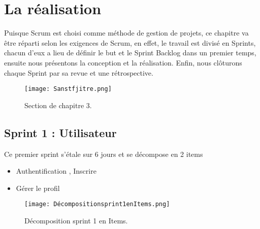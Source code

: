 \chapter{La réalisation }
\label{sec:conception}

\begin{fquote}Puisque Scrum est choisi comme méthode de gestion de projets, ce chapitre va être réparti selon
	les exigences de Scrum, en effet, le travail est divisé en Sprints, chacun d’eux a lieu de définir le but
	et le Sprint Backlog dans un premier temps, ensuite nous présentons la conception et la réalisation.
	Enfin, nous clôturons chaque Sprint par sa revue et une rétrospective.
 \end{fquote}
\begin{figure}[ht]
	\centering
	\texttt{[image: Sanstfjitre.png]}
	\caption{Section de chapitre 3.}
	\label{fig:Section de chapitre 3}
\end{figure}
\FloatBarrier
\clearpage

\section{Sprint 1 : Utilisateur }
\label{sec:conception}

\begin{fquote}
Ce premier sprint s’étale sur 6 jours et se décompose en 2 items  \end{fquote}
\smallskip
\begin{itemize}[label=$\diamond$]
	\item Authentification , Inscrire
	\item Gérer le profil
\end{itemize}
\medskip
\medskip
\medskip
\medskip
\medskip
\medskip
\medskip
\medskip
\medskip
\medskip
\begin{figure}[ht]
	\centering
	\texttt{[image: Décompositionsprint1enItems.png]}
	\caption{Décomposition sprint 1 en Items.}
	\label{fig:Décomposition sprint 1 en Items}
\end{figure}
\FloatBarrier
\clearpage

